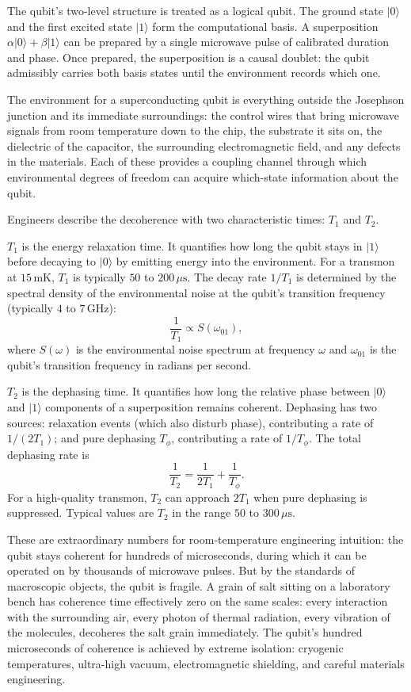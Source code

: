 The qubit's two-level structure is treated as a logical qubit. The ground
state $|0\rangle$ and the first excited state $|1\rangle$ form the
computational basis. A superposition $\alpha|0\rangle + \beta|1\rangle$ can
be prepared by a single microwave pulse of calibrated duration and phase.
Once prepared, the superposition is a causal doublet: the qubit
admissibly carries both basis states until the environment records which
one.

The environment for a superconducting qubit is everything outside the
Josephson junction and its immediate surroundings: the control wires
that bring microwave signals from room temperature down to the chip, the
substrate it sits on, the dielectric of the capacitor, the surrounding
electromagnetic field, and any defects in the materials. Each of these
provides a coupling channel through which environmental degrees of
freedom can acquire which-state information about the qubit.

Engineers describe the decoherence with two characteristic times: $T_1$
and $T_2$.

$T_1$ is the energy relaxation time. It quantifies how long the qubit
stays in $|1\rangle$ before decaying to $|0\rangle$ by emitting energy
into the environment. For a transmon at $15\,\mathrm{mK}$, $T_1$ is
typically $50$ to $200\,\mu\mathrm{s}$. The decay rate $1/T_1$ is
determined by the spectral density of the environmental noise at the
qubit's transition frequency (typically $4$ to $7\,\mathrm{GHz}$):
\[
\frac{1}{T_1} \propto S(\omega_{01}),
\]
where $S(\omega)$ is the environmental noise spectrum at frequency
$\omega$ and $\omega_{01}$ is the qubit's transition frequency in
radians per second.

$T_2$ is the dephasing time. It quantifies how long the relative phase
between $|0\rangle$ and $|1\rangle$ components of a superposition
remains coherent. Dephasing has two sources: relaxation events (which
also disturb phase), contributing a rate of $1/(2T_1)$; and pure
dephasing $T_\phi$, contributing a rate of $1/T_\phi$. The total
dephasing rate is
\[
\frac{1}{T_2} = \frac{1}{2T_1} + \frac{1}{T_\phi}.
\]
For a high-quality transmon, $T_2$ can approach $2T_1$ when pure
dephasing is suppressed. Typical values are $T_2$ in the range $50$ to
$300\,\mu\mathrm{s}$.

These are extraordinary numbers for room-temperature engineering
intuition: the qubit stays coherent for hundreds of microseconds, during
which it can be operated on by thousands of microwave pulses. But by
the standards of macroscopic objects, the qubit is fragile. A grain of
salt sitting on a laboratory bench has coherence time effectively zero
on the same scales: every interaction with the surrounding air, every
photon of thermal radiation, every vibration of the molecules, decoheres
the salt grain immediately. The qubit's hundred microseconds of coherence
is achieved by extreme isolation: cryogenic temperatures, ultra-high
vacuum, electromagnetic shielding, and careful materials engineering.

